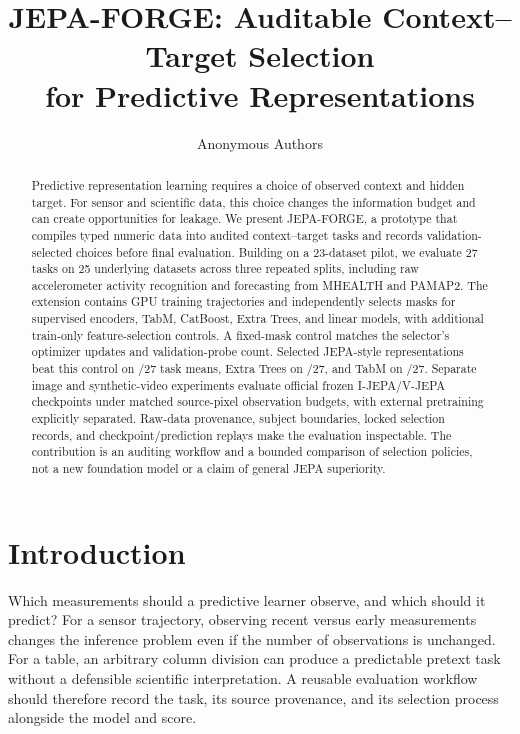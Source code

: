 \documentclass{article}
\title{JEPA-FORGE: Auditable Context--Target Selection\\for Predictive Representations}
\author{Anonymous Authors}
\newcommand{\jepa}{JEPA-FORGE}
\begin{document}
\maketitle

\begin{abstract}
Predictive representation learning requires a choice of observed context and hidden target. For sensor and scientific data, this choice changes the information budget and can create opportunities for leakage. We present \jepa{}, a prototype that compiles typed numeric data into audited context--target tasks and records validation-selected choices before final evaluation. Building on a 23-dataset pilot, we evaluate 27 tasks on 25 underlying datasets across three repeated splits, including raw accelerometer activity recognition and forecasting from MHEALTH and PAMAP2. The extension contains \ExtRuns{} GPU training trajectories and independently selects masks for supervised encoders, TabM, CatBoost, Extra Trees, and linear models, with additional train-only feature-selection controls. A fixed-mask control matches the selector's optimizer updates and validation-probe count. Selected JEPA-style representations beat this control on \ExtPolicyWins/27 task means, Extra Trees on \ExtTreesWins/27, and TabM on \ExtTabMWins/27. Separate image and synthetic-video experiments evaluate official frozen I-JEPA/V-JEPA checkpoints under matched source-pixel observation budgets, with external pretraining explicitly separated. Raw-data provenance, subject boundaries, locked selection records, and checkpoint/prediction replays make the evaluation inspectable. The contribution is an auditing workflow and a bounded comparison of selection policies, not a new foundation model or a claim of general JEPA superiority.
\end{abstract}

\section{Introduction}
Which measurements should a predictive learner observe, and which should it predict? For a sensor trajectory, observing recent versus early measurements changes the inference problem even if the number of observations is unchanged. For a table, an arbitrary column division can produce a predictable pretext task without a defensible scientific interpretation. A reusable evaluation workflow should therefore record the task, its source provenance, and its selection process alongside the model and score.
\end{document}
